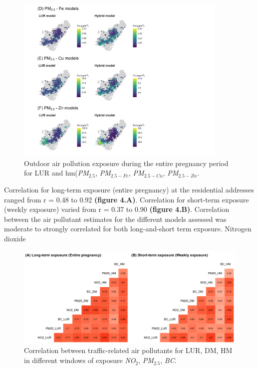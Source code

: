 \documentclass{article}
\begin{document}
\captionsetup[figure]{skip=6pt}
\begin{figure}[!htb]
\includegraphics[width=0.9\textwidth]{figures/combined_figure2.png}
\caption{Outdoor air pollution exposure during the entire pregnancy period for LUR and hm(\textit{PM$_{2.5}$}, \textit{PM$_{2.5-Fe}$}, \textit{PM$_{2.5-Cu}$}, \textit{PM$_{2.5-Zn}$}.}
\end{figure}

\newpage
Correlation for long-term exposure (entire pregnancy) at the residential addresses ranged from r = 0.48 to 0.92 \textbf{(figure 4.A)}. Correlation for short-term exposure (weekly exposure) varied from r = 0.37 to 0.90 \textbf{(figure 4.B)}. Correlation between the air pollutant estimates for the different models assessed was moderate to strongly correlated for both long-and-short term exposure. Nitrogen dioxide 

\captionsetup[figure]{skip=6pt}
\begin{figure}[!htb]
\includegraphics[width=1.0\textwidth]{figures/correlation_fig.png}
\caption{Correlation between traffic-related air pollutants for LUR, DM, HM in different windows of exposure \textit{NO$_2$}, \textit{PM$_{2.5}$}, \textit{BC}.}
\end{figure}
\end{document}
